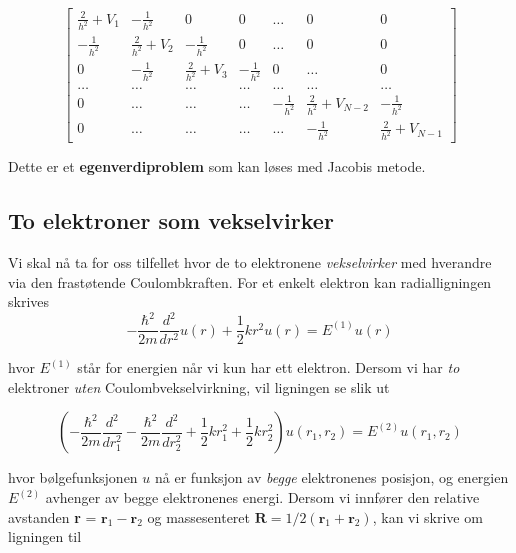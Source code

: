\documentclass{article}
\begin{document}
\begin{equation}
    \begin{bmatrix} \frac{2}{h^2}+V_1 & -\frac{1}{h^2} & 0   & 0    & \dots  &0     & 0 \\
                                -\frac{1}{h^2} & \frac{2}{h^2}+V_2 & -\frac{1}{h^2} & 0    & \dots  &0     &0 \\
                                0   & -\frac{1}{h^2} & \frac{2}{h^2}+V_3 & -\frac{1}{h^2}  &0       &\dots & 0\\
                                \dots  & \dots & \dots & \dots  &\dots      &\dots & \dots\\
                                0   & \dots & \dots & \dots  &-\frac{1}{h^2}  &\frac{2}{h^2}+V_{N-2} & -\frac{1}{h^2}\\
                                0   & \dots & \dots & \dots  &\dots       &-\frac{1}{h^2} & \frac{2}{h^2}+V_{N-1}
             \end{bmatrix}
\label{eq:matrixse} 
\end{equation}

Dette er et \textbf{egenverdiproblem} som kan løses med Jacobis metode. 

\subsection{To elektroner som vekselvirker}
Vi skal nå ta for oss tilfellet hvor de to elektronene \textit{vekselvirker} med hverandre via den frastøtende Coulombkraften. For et enkelt elektron kan radialligningen skrives
\begin{equation}
-\frac{\hbar ^2}{2m}\frac{d^2}{dr^2}u(r) + \frac{1}{2}kr^2u(r) = E^{(1)}u(r)
\end{equation}

hvor $E^{(1)}$ står for energien når vi kun har ett elektron. Dersom vi har \textit{to} elektroner \textit{uten} Coulombvekselvirkning, vil ligningen se slik ut

\begin{equation}
\left(  -\frac{\hbar^2}{2 m} \frac{d^2}{dr_1^2} -\frac{\hbar^2}{2 m} \frac{d^2}{dr_2^2}+ \frac{1}{2}k r_1^2+ \frac{1}{2}k r_2^2\right)u(r_1,r_2)  = E^{(2)} u(r_1,r_2)
\end{equation}

hvor bølgefunksjonen $u$ nå er funksjon av \textit{begge} elektronenes posisjon, og energien $E^{(2)}$ avhenger av begge elektronenes energi. Dersom vi innfører den relative avstanden \textbf{r} = $\textbf{r}_1 - \textbf{r}_2$ og massesenteret $\textbf{R} = 1/2(\textbf{r}_1 + \textbf{r}_2)$, kan vi skrive om ligningen til
\end{document}
